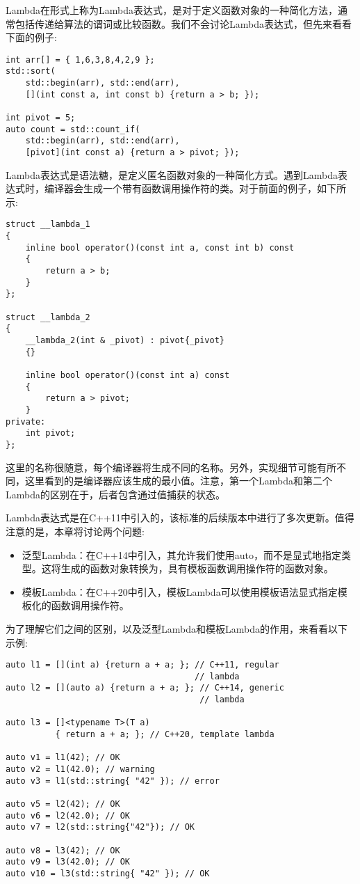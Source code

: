 Lambda在形式上称为Lambda表达式，是对于定义函数对象的一种简化方法，通常包括传递给算法的谓词或比较函数。我们不会讨论Lambda表达式，但先来看看下面的例子:

\begin{lstlisting}[style=styleCXX]
int arr[] = { 1,6,3,8,4,2,9 };
std::sort(
	std::begin(arr), std::end(arr),
	[](int const a, int const b) {return a > b; });
	
int pivot = 5;
auto count = std::count_if(
	std::begin(arr), std::end(arr),
	[pivot](int const a) {return a > pivot; });
\end{lstlisting}

Lambda表达式是语法糖，是定义匿名函数对象的一种简化方式。遇到Lambda表达式时，编译器会生成一个带有函数调用操作符的类。对于前面的例子，如下所示:

\begin{lstlisting}[style=styleCXX]
struct __lambda_1
{
	inline bool operator()(const int a, const int b) const
	{
		return a > b;
	}
};

struct __lambda_2
{
	__lambda_2(int & _pivot) : pivot{_pivot}
	{}
	
	inline bool operator()(const int a) const
	{
		return a > pivot;
	}
private:
	int pivot;
};
\end{lstlisting}

这里的名称很随意，每个编译器将生成不同的名称。另外，实现细节可能有所不同，这里看到的是编译器应该生成的最小值。注意，第一个Lambda和第二个Lambda的区别在于，后者包含通过值捕获的状态。

Lambda表达式是在C++11中引入的，该标准的后续版本中进行了多次更新。值得注意的是，本章将讨论两个问题:

\begin{itemize}
\item 
泛型Lambda：在C++14中引入，其允许我们使用auto，而不是显式地指定类型。这将生成的函数对象转换为，具有模板函数调用操作符的函数对象。

\item 
模板Lambda：在C++20中引入，模板Lambda可以使用模板语法显式指定模板化的函数调用操作符。
\end{itemize}

为了理解它们之间的区别，以及泛型Lambda和模板Lambda的作用，来看看以下示例:

\begin{lstlisting}[style=styleCXX]
auto l1 = [](int a) {return a + a; }; // C++11, regular
                                      // lambda
auto l2 = [](auto a) {return a + a; }; // C++14, generic
                                       // lambda
                                       
auto l3 = []<typename T>(T a)
          { return a + a; }; // C++20, template lambda

auto v1 = l1(42); // OK
auto v2 = l1(42.0); // warning
auto v3 = l1(std::string{ "42" }); // error

auto v5 = l2(42); // OK
auto v6 = l2(42.0); // OK
auto v7 = l2(std::string{"42"}); // OK

auto v8 = l3(42); // OK
auto v9 = l3(42.0); // OK
auto v10 = l3(std::string{ "42" }); // OK
\end{lstlisting}

